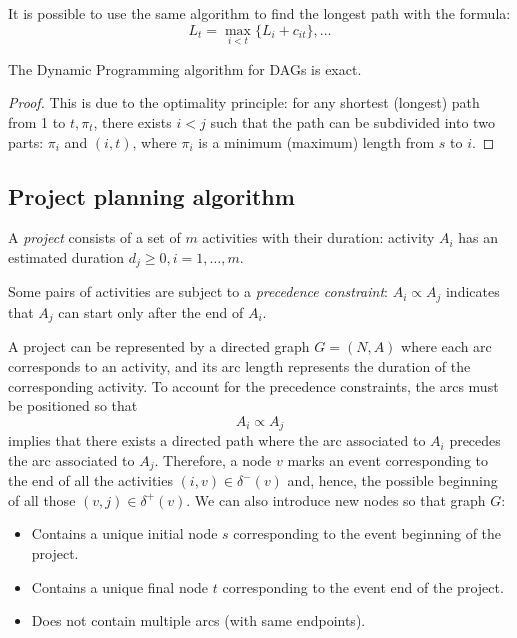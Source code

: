 \documentclass[12pt, a4paper]{report}
\begin{document}
    It is possible to use the same algorithm to find the longest path with the formula: 
    \[L_t=\max_{i<t}\{L_i+c_{it}\},\dots\]

    \begin{proposition}
        The Dynamic Programming algorithm for DAGs is exact. 
    \end{proposition}
    \begin{proof}
        This is due to the optimality principle: for any shortest (longest) path from 1 to $t,\pi_t$, there exists $i < j$ such that the path can be subdivided into two parts: 
        $\pi_i$ and $(i,t)$, where $\pi_i$ is a minimum (maximum) length from $s$ to $i$. 
    \end{proof}

    \subsection{Project planning algorithm}
    \begin{definition}
        A \emph{project} consists of a set of $m$ activities with their duration: activity $A_i$ has an estimated duration $d_j \geq 0, i=1,\dots,m$. 

        Some pairs of activities are subject to a \emph{precedence constraint}: $A_i \varpropto A_j$  indicates that $A_j$ can start only after the end of $A_i$. 
    \end{definition}
    A project can be represented by a directed graph $G = (N, A)$ where each arc corresponds to an activity, and its arc length represents the duration of the corresponding 
    activity. To account for the precedence constraints, the arcs must be positioned so that 
    \[A_i \varpropto A_j\]
    implies that there exists a directed path where the arc associated to $A_i$ precedes the arc associated to $A_j$. Therefore, a node $v$ marks an event corresponding to the end of 
    all the activities $(i,v) \in \delta^{-}(v)$ and, hence, the possible beginning of all those $(v,j) \in \delta^{+}(v)$. 
    We can also introduce new nodes so that graph $G$: 
    \begin{itemize}
        \item Contains a unique initial node $s$ corresponding to the event beginning of the project.
        \item Contains a unique final node $t$ corresponding to the event end of the project. 
        \item Does not contain multiple arcs (with same endpoints). 
    \end{itemize}
\end{document}
